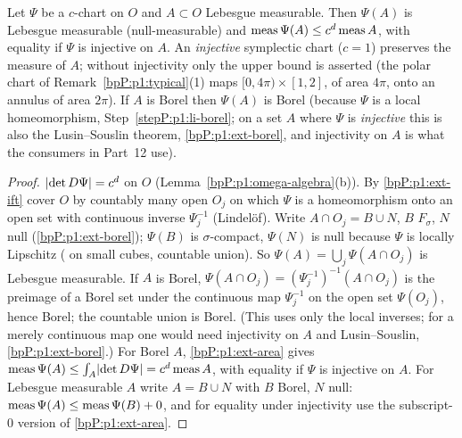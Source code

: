 \begin{lemma}\label{bpP:p1:liouville}\label{bpP:p1:measure-symplectic}
Let $\Psi$ be a $c$-chart on $O$ and $A\subset O$ Lebesgue measurable. Then $\Psi(A)$ is Lebesgue measurable (null-measurable) and $\operatorname{meas}\Psi(A)\le c^d\operatorname{meas} A$, with equality if $\Psi$ is injective on $A$. An \emph{injective} symplectic chart ($c=1$) preserves the measure of $A$; without injectivity only the upper bound is asserted (the polar chart of Remark~\ref{bpP:p1:typical}(1) maps $[0,4\pi)\times[1,2]$, of area $4\pi$, onto an annulus of area $2\pi$). If $A$ is Borel then $\Psi(A)$ is Borel (because $\Psi$ is a local homeomorphism, Step~\ref{stepP:p1:li-borel}; on a set $A$ where $\Psi$ is \emph{injective} this is also the Lusin--Souslin theorem, \ref{bpP:p1:ext-borel}, and injectivity on $A$ is what the consumers in Part~12 use).
\end{lemma}
\begin{proof}
\label{stepP:p1:li-det} $\lvert \det D\Psi\rvert=c^d$ on $O$ (Lemma~\ref{bpP:p1:omega-algebra}(b)).
\label{stepP:p1:li-meas} By \ref{bpP:p1:ext-ift} cover $O$ by countably many open $O_j$ on which $\Psi$ is a homeomorphism onto an open set with continuous inverse $\Psi_j^{-1}$ (Lindel\"of). Write $A\cap O_j=B\cup N$, $B$ $F_\sigma$, $N$ null (\ref{bpP:p1:ext-borel}); $\Psi(B)$ is $\sigma$-compact, $\Psi(N)$ is null because $\Psi$ is locally Lipschitz ( on small cubes, countable union). So $\Psi(A)=\bigcup_j\Psi(A\cap O_j)$ is Lebesgue measurable.
\label{stepP:p1:li-borel} If $A$ is Borel, $\Psi(A\cap O_j)=(\Psi_j^{-1})^{-1}(A\cap O_j)$ is the preimage of a Borel set under the continuous map $\Psi_j^{-1}$ on the open set $\Psi(O_j)$, hence Borel; the countable union is Borel. (This uses only the local inverses; for a merely continuous map one would need injectivity on $A$ and Lusin--Souslin, \ref{bpP:p1:ext-borel}.)
\label{stepP:p1:li-vol} For Borel $A$, \ref{bpP:p1:ext-area} gives $\operatorname{meas}\Psi(A)\le\int_A\lvert \det D\Psi\rvert=c^d\operatorname{meas} A$, with equality if $\Psi$ is injective on $A$. For Lebesgue measurable $A$ write $A=B\cup N$ with $B$ Borel, $N$ null: $\operatorname{meas}\Psi(A)\le\operatorname{meas}\Psi(B)+0$, and for equality under injectivity use the subscript-$0$ version of \ref{bpP:p1:ext-area}.
\end{proof}

